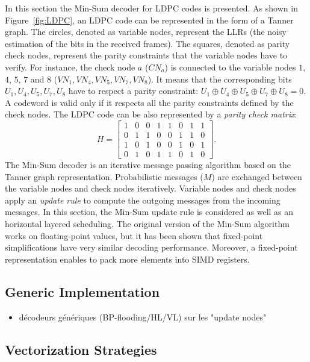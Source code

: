 In this section the Min-Sum decoder for LDPC codes is presented. As shown in
Figure~\ref{fig:LDPC}, an LDPC code can be represented in the form of a Tanner
graph. The circles, denoted as variable nodes, represent the LLRs (the noisy
estimation of the bits in the received frames). The squares, denoted as parity
check nodes, represent the parity constraints that the variable nodes have to
verify. For instance, the check node $a$ ($CN_a$) is connected to the variable
nodes $1$, $4$, $5$, $7$ and $8$ ($VN_1, VN_4, VN_5, VN_7, VN_8$). It means that
the corresponding bits $U_1, U_4, U_5, U_7, U_8$ have to respect a parity
constraint: $U_1 \oplus U_4 \oplus U_5 \oplus U_7 \oplus U_8 = 0$. A codeword is
valid only if it respects all the parity constraints defined by the check nodes.
The LDPC code can be also represented by a \textit{parity check matrix}:
{ \begin{equation*}
H =
\begin{bmatrix}
  1&0&0&1&1&0&1&1\\
  0&1&1&0&0&1&1&0\\
  1&0&1&0&0&1&0&1\\
  0&1&0&1&1&0&1&0
\end{bmatrix}.
\end{equation*}
}
The Min-Sum decoder is an iterative message passing algorithm based on the
Tanner graph representation. Probabilistic messages ($M$) are exchanged between
the variable nodes and check nodes iteratively. Variable nodes and check nodes
apply an \textit{update rule} to compute the outgoing messages from the incoming
messages. In this section, the Min-Sum update rule is considered as well as an
horizontal layered scheduling. The original version of the Min-Sum algorithm
works on floating-point values, but it has been shown that fixed-point
simplifications have very similar decoding performance. Moreover, a fixed-point
representation enables to pack more elements into SIMD registers.

\subsection{Generic Implementation}

\begin{itemize}
  \item décodeurs génériques (BP-flooding/HL/VL) sur les "update nodes"
\end{itemize}

\subsection{Vectorization Strategies}

